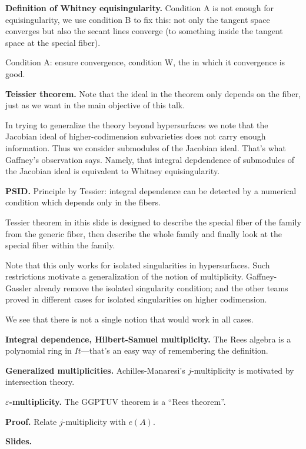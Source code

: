 \medskip\noindent
{\bf Definition of Whitney equisingularity.}
Condition A is not enough for
equisingularity, we use condition B to fix
this: not only the tangent space converges
but also the secant lines converge
(to something inside the tangent space at
the special fiber).

Condition A: ensure convergence,
condition W, the in which it convergence is
good.

\medskip\noindent
{\bf Teissier theorem.}
Note that the ideal in the theorem
only depends on the fiber, just as
we want in the main objective of this talk.

In trying to generalize the theory beyond
hypersurfaces we note that the Jacobian
ideal of higher-codimension subvarieties
does not carry enough information. Thus we
consider submodules of the Jacobian
ideal. That's what Gaffney's observation
says. Namely, that integral depdendence
of submodules of the Jacobian ideal
is equivalent to Whitney equisingularity.

\medskip\noindent
{\bf PSID.} Principle by Tessier:
integral dependence can be detected
by a numerical condition which depends only in
the fibers.

Tessier theorem in ithis slide is designed
to describe the special fiber of the family
from the generic fiber, then describe the
whole family and finally look at the special
fiber within the family.

Note that this only works for isolated
singularities in hypersurfaces. Such
restrictions motivate a generalization of
the notion of multiplicity.
Gaffney-Gassler already remove the
isolated singularity condition; and the
other teams proved in different cases for
isolated singularities on higher
codimension.

We see that there is not a single notion
that would work in all cases.

\medskip\noindent
{\bf Integral dependence, Hilbert-Samuel
multiplicity.}
The Rees algebra is a polynomial ring
in $It$---that's an easy way of remembering
the definition.


\medskip\noindent
{\bf Generalized multiplicities.}
Achilles-Manaresi's $j$-multiplicity is
motivated by intersection theory.

\medskip\noindent
{\bf $\varepsilon$-multiplicity.}
The GGPTUV theorem is a ``Rees theorem''.

\medskip\noindent
{\bf Proof.} Relate $j$-multiplicity
with $e(A)$.

\medskip\noindent
{\bf Slides.}

